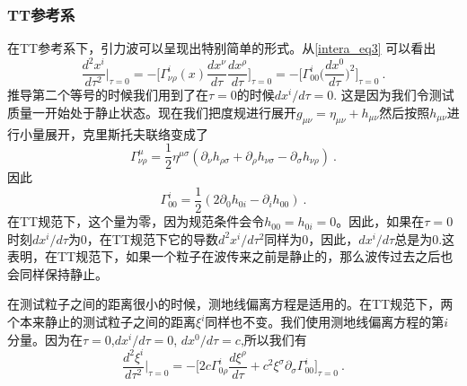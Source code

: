 \subsubsection{TT参考系}
在TT参考系下，引力波可以呈现出特别简单的形式。从\autoref{intera_eq3} 可以看出
\begin{equation}
\frac{d^2 x^i}{d\tau^2} \bigg|_{\tau = 0} = - \bigg[ \Gamma^i_{\nu\rho} (x) \frac{dx^\nu}{d\tau} \frac{dx^\rho}{d\tau} \bigg]_{\tau = 0} = - \bigg[ \Gamma^i_{00} \bigg( \frac{dx^0}{d\tau} \bigg)^2 \bigg]_{\tau = 0}~.
\end{equation}
推导第二个等号的时候我们用到了在$\tau = 0$的时候$dx^i/d\tau = 0$. 这是因为我们令测试质量一开始处于静止状态。现在我们把度规进行展开$g_{\mu\nu} = \eta_{\mu\nu} + h_{\mu\nu}$然后按照$h_{\mu\nu}$进行小量展开，克里斯托夫联络变成了
\begin{equation}
\Gamma^\mu_{\nu\rho} = \frac{1}{2} \eta^{\mu\sigma} (\partial_\nu h_{\rho\sigma} + \partial_\rho h_{\nu\sigma} - \partial_{\sigma} h_{\nu\rho}  )~. 
\end{equation}
因此
\begin{equation}
\Gamma^i_{00} = \frac{1}{2} (2\partial_0 h_{0i} - \partial_i h_{00}) ~.
\end{equation}
在TT规范下，这个量为零，因为规范条件会令$h_{00} = h_{0i} = 0$。因此，如果在$\tau = 0$时刻$dx^i/d\tau$为0，在TT规范下它的导数$d^2 x^i/d\tau^2$同样为0，因此，$dx^i/d\tau$总是为0.这表明，在TT规范下，如果一个粒子在波传来之前是静止的，那么波传过去之后也会同样保持静止。

在测试粒子之间的距离很小的时候，测地线偏离方程是适用的。在TT规范下，两个本来静止的测试粒子之间的距离$\xi^i$同样也不变。我们使用测地线偏离方程的第$i$分量。因为在$\tau = 0$,$dx^i/d\tau = 0$, $dx^0/d\tau = c$,所以我们有
\begin{equation}
\frac{d^2\xi^i}{d\tau^2} \bigg|_{\tau = 0} = - \bigg[ 2 c \Gamma^i_{0\rho} \frac{d\xi^\rho}{d\tau} + c^2 \xi^\sigma \partial_\sigma \Gamma^i_{00} \bigg]_{\tau = 0}~.
\end{equation}




